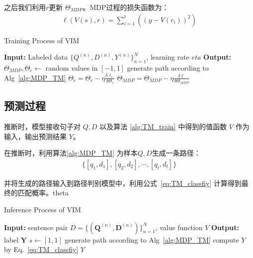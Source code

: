之后我们利用$r$更新 $\Theta_{MDP}$。MDP过程的损失函数为：
\begin{equation}\label{eq:}
	\begin{aligned}
		\ell(V(s), r) = \sum_{i=1}^t\left((y - V(r_i))^2\right)
	\end{aligned}
\end{equation}

\begin{algorithm}[!htbp]
	\small
	\caption{Training Process of VIM}
	\label{alg:VIM_train}
	\begin{algorithmic}
		\STATE \textbf{Input:} Labeled data $\{Q^{(n)}, D^{(n)}, Y^{(n)}\}_{n=1}^N$, learning rate $eta$
		\STATE \textbf{Output:} $\Theta_{MDP}, \Theta_{c} \leftarrow$ random values in $[-1, 1]$
			\STATE generate path according to Alg~\ref{alg:MDP_TM}
				\STATE $\Theta_{c} = \Theta_{c} - \eta \frac{\delta \ell_c}{\delta \Theta_{c}}$ 
			\ENDWHILE
			\STATE $\Theta_{MDP} = \Theta_{MDP} - \eta \frac{\delta \ell}{\delta \Theta_{MDP}}$ 
			\ENDWHILE
	\end{algorithmic}	
\end{algorithm}

\subsection{预测过程}
推断时，模型接收句子对 $Q, D$ 以及算法 \ref{alg:TM_train} 中得到的值函数 $V$ 作为输入，输出预测结果 $Y$。

在推断时，利用算法\ref{alg:MDP_TM} 为样本$Q, D$生成一条路径：
\begin{equation}\label{eq:}
	\begin{aligned}
		\{[q_1, d_1], [q_2, d_2], \cdots, [q_t, d_t]\}
	\end{aligned}
\end{equation}

并将生成的路径输入到路径判别模型中，利用公式~\ref{eq:TM_classfiy} 计算得到最终的匹配概率。theta

\begin{algorithm}[!htbp]
    \small
    \caption{Inference Process of VIM}\label{alg:TM_inf}
    \begin{algorithmic}
        \STATE \textbf{Input:} sentence pair $D=\{ (\mathbf{Q}^{(n)}, \mathbf{D}^{(n)})\}_{n=1}^N$, value function $V$
        \STATE \textbf{Output:} label $\mathbf{Y}$
        \STATE $s \leftarrow [1,1]$
        \STATE generate path according to Alg~\ref{alg:MDP_TM}
        \STATE compute $Y$ by Eq.~\ref{eq:TM_classfiy}
        \STATE \RETURN  $Y$
    \end{algorithmic}
\end{algorithm}

